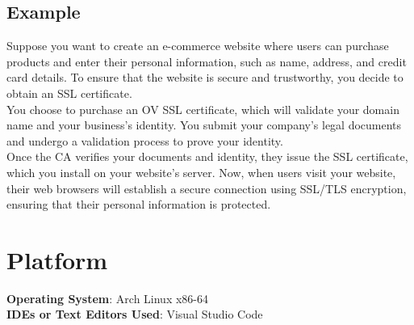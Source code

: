 \documentclass[openany]{book}
\begin{document}
\subsection{Example}
Suppose you want to create an e-commerce website where users can purchase products and enter their personal information, such as name, address, and credit card details. To ensure that the website is secure and trustworthy, you decide to obtain an SSL certificate.\\

You choose to purchase an OV SSL certificate, which will validate your domain name and your business's identity. You submit your company's legal documents and undergo a validation process to prove your identity.\\

Once the CA verifies your documents and identity, they issue the SSL certificate, which you install on your website's server. Now, when users visit your website, their web browsers will establish a secure connection using SSL/TLS encryption, ensuring that their personal information is protected.

\section{Platform}
\textbf{\textbf{Operating System}}: Arch Linux x86-64 \\
\textbf{\textbf{IDEs or Text Editors Used}}: Visual Studio Code\\
\end{document}

